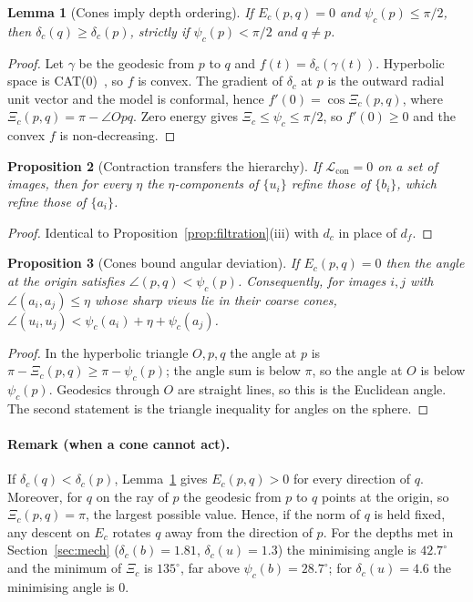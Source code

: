 \documentclass[10pt]{article}
\newtheorem{proposition}{Proposition}
\newtheorem{lemma}[proposition]{Lemma}
\newcommand{\Lb}{\mathcal{L}}
\begin{document}
\begin{lemma}[Cones imply depth ordering]\label{lem:depth}
If $E_c(p,q)=0$ and $\psi_c(p)\le\pi/2$, then $\delta_c(q)\ge\delta_c(p)$, strictly if $\psi_c(p)<\pi/2$ and
$q\neq p$.
\end{lemma}
\begin{proof}
Let $\gamma$ be the geodesic from $p$ to $q$ and $f(t)=\delta_c(\gamma(t))$. Hyperbolic space is
CAT(0)~\cite{bridson1999metric}, so $f$ is convex. The gradient of $\delta_c$ at $p$ is the outward radial unit
vector and the model is conformal, hence $f'(0)=\cos\Xi_c(p,q)$, where $\Xi_c(p,q)=\pi-\angle Opq$. Zero energy
gives $\Xi_c\le\psi_c\le\pi/2$, so $f'(0)\ge0$ and the convex $f$ is non-decreasing.
\end{proof}

\begin{proposition}[Contraction transfers the hierarchy]\label{prop:contraction}
If $\Lb_{\mathrm{con}}=0$ on a set of images, then for every $\eta$ the $\eta$-components of $\{u_i\}$
refine those of $\{b_i\}$, which refine those of $\{a_i\}$.
\end{proposition}
\begin{proof}Identical to Proposition~\ref{prop:filtration}(iii) with $d_c$ in place of $d_f$.\end{proof}

\begin{proposition}[Cones bound angular deviation]\label{prop:angle}
If $E_c(p,q)=0$ then the angle at the origin satisfies $\angle(p,q)<\psi_c(p)$.
Consequently, for images $i,j$ with $\angle(a_i,a_j)\le\eta$ whose sharp views lie in their coarse cones,
$\angle(u_i,u_j)<\psi_c(a_i)+\eta+\psi_c(a_j)$.
\end{proposition}
\begin{proof}
In the hyperbolic triangle $O,p,q$ the angle at $p$ is $\pi-\Xi_c(p,q)\ge\pi-\psi_c(p)$; the angle sum is below
$\pi$, so the angle at $O$ is below $\psi_c(p)$. Geodesics through $O$ are straight lines, so this is the
Euclidean angle. The second statement is the triangle inequality for angles on the sphere.
\end{proof}

\paragraph{Remark (when a cone cannot act).} If $\delta_c(q)<\delta_c(p)$, Lemma~\ref{lem:depth} gives
$E_c(p,q)>0$ for every direction of $q$. Moreover, for $q$ on the ray of $p$ the geodesic from $p$ to $q$ points
at the origin, so $\Xi_c(p,q)=\pi$, the largest possible value. Hence, if the norm of $q$ is held fixed, any
descent on $E_c$ rotates $q$ away from the direction of $p$. For the depths met in Section~\ref{sec:mech}
($\delta_c(b)=1.81$, $\delta_c(u)=1.3$) the minimising angle is $42.7^\circ$ and the minimum of $\Xi_c$ is
$135^\circ$, far above $\psi_c(b)=28.7^\circ$; for $\delta_c(u)=4.6$ the minimising angle is $0$.
\end{document}
